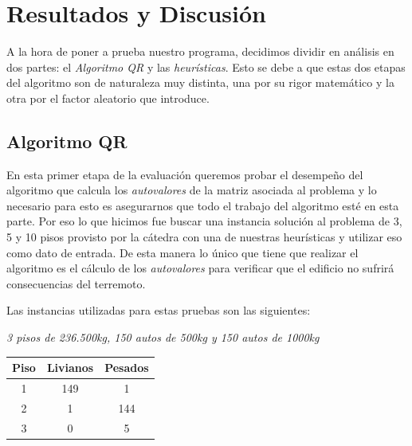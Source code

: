 \documentclass[a4paper]{article}
\begin{document}

\newpage

\section{Resultados y Discusión}

A la hora de poner a prueba nuestro programa, decidimos dividir en análisis en dos partes: el \textit{Algoritmo QR} y las \textit{heurísticas}. Esto se debe a que estas dos etapas del algoritmo son de naturaleza muy distinta, una por su rigor matemático y la otra por el factor  aleatorio que introduce.

\subsection{Algoritmo QR}

En esta primer etapa de la evaluación queremos probar el desempeño del algoritmo que calcula los \textit{autovalores} de la matriz asociada al problema y lo necesario para esto es asegurarnos que todo el trabajo del algoritmo esté en esta parte. Por eso lo que hicimos fue buscar una instancia solución al problema de 3, 5 y 10 pisos provisto por la cátedra con una de nuestras heurísticas y utilizar eso como dato de entrada. De esta manera lo único que tiene que realizar el algoritmo es el cálculo de los \textit{autovalores} para verificar que el edificio no sufrirá consecuencias del terremoto.

Las instancias utilizadas para estas pruebas son las siguientes:

\vspace{2em}
\textit{3 pisos de 236.500kg, 150 autos de 500kg y 150 autos de 1000kg}
\begin{center}
\begin{tabular}{|c|c|c|}
  \hline
  Piso & Livianos & Pesados \\
  \hline
1   & 149 & 1     \\
2   & 1     & 144 \\
3   & 0     & 5     \\
\hline
\end{tabular}
\end{center}
\end{document}
